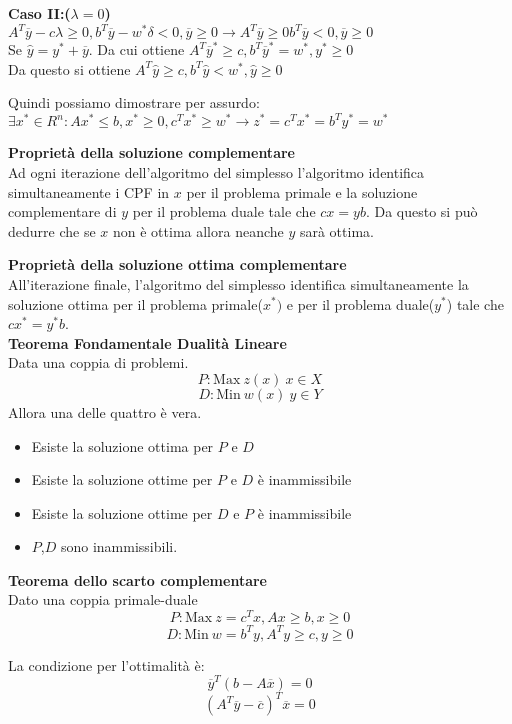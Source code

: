 \documentclass{article}
\begin{document}
\begin{tcolorbox}[
    colback=lightgray,
    colframe=black,
    coltext=black,
    title=Dimostrazione,
    colbacktitle=black,
    coltitle=lightgray,
    breakable
  ]
  \textbf{Caso II:($\lambda = 0$)}\\
  $A^T\overline{y}-c\lambda \ge 0, b^T\overline{y}-w^{\ast}\delta<0, \overline{y} \ge 0 \rightarrow A^T\overline{y} \ge 0 b^T\overline{y}<0, \overline{y} \ge 0$\\
  Se $\hat{y}=y^{\ast}+\overline{y}$. Da cui ottiene $A^T\overline{y}^{\ast} \ge c, b^T\overline{y}^{\ast}=w^{\ast}, y^{\ast}\ge 0$\\
  Da questo si ottiene $A^T\hat{y}\ge c, b^T\hat{y} < w^{\ast}, \hat{y}\ge 0$

  Quindi possiamo dimostrare per assurdo: $\exists x^{\ast} \in R^n: Ax^{\ast} \le b, x^{\ast} \ge 0, c^Tx^{\ast}\ge w^{\ast} \to z^{\ast}=c^Tx^{\ast}=b^Ty^{\ast}=w^{\ast}$
\end{tcolorbox}

\textbf{Proprietà della soluzione complementare}\\
Ad ogni iterazione dell'algoritmo del simplesso l'algoritmo identifica simultaneamente i CPF in $x$ per il problema primale e la soluzione complementare di $y$ per il problema duale tale che $cx=yb$. Da questo si può dedurre che se $x$ non è ottima allora neanche $y$ sarà ottima.

\textbf{Proprietà della soluzione ottima complementare}\\
All'iterazione finale, l'algoritmo del simplesso identifica simultaneamente la soluzione ottima per il problema primale($x^{\ast})$ e per il problema duale($y^{\ast}$) tale che $cx^{\ast}=y^{\ast}b$.\\

\textbf{Teorema Fondamentale Dualità Lineare}\\
Data una coppia di problemi.\\
$$ P: \text{Max}\ z(x)\ x \in X$$ 
$$D: \text{Min}\ w(x)\ y \in Y$$
Allora una delle quattro è vera.
\begin{itemize}
  \item Esiste la soluzione ottima per $P$ e $D$
  \item Esiste la soluzione ottime per $P$ e $D$ è inammissibile
  \item Esiste la soluzione ottime per $D$ e $P$ è inammissibile
  \item $P$,$D$ sono inammissibili.
\end{itemize}

\textbf{Teorema dello scarto complementare}\\
Dato una coppia primale-duale\\
$$P: \text{Max}\ z=c^Tx, Ax \ge b, x \ge 0$$
$$D: \text{Min}\ w=b^Ty, A^Ty \ge c, y \ge 0$$

La condizione per l'ottimalità è:
$$\overline{y}^T(b-A\overline{x})=0$$
$$(A^T\overline{y}-\overline{c})^T\overline{x}=0$$
\end{document}
